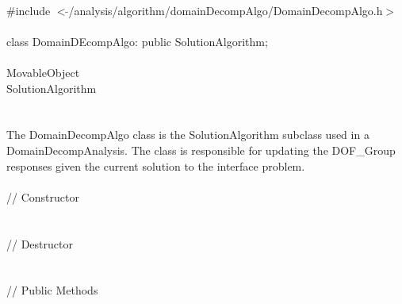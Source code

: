 
   \\
\indent \#include $<\tilde{
}$/analysis/algorithm/domainDecompAlgo/DomainDecompAlgo.h$>$  \\  

  \\
\indent class DomainDEcompAlgo: public SolutionAlgorithm;  \\

 \\
\indent MovableObject \\
\indent\indent SolutionAlgorithm \\
\indent\indent{} \\

 \\ 
\indent The DomainDecompAlgo class is the SolutionAlgorithm subclass
used in a DomainDecompAnalysis. The class is responsible for updating
the DOF\_Group responses given the current solution to the interface
problem. \\ 

 \\ 
\indent\indent // Constructor \\ 
\indent{}\\ \\
\indent\indent // Destructor \\
\indent{}\\  \\
\indent\indent // Public Methods  \\
\indent{} \\
\indent{}\\
\indent{}\\
\indent{} \\


